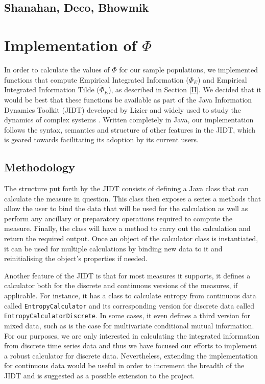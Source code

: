 \documentclass[a4paper,11pt]{article}
\begin{document}
\subsection{Shanahan, Deco, Bhowmik}

\clearpage
\section{Implementation of $\Phi$}
\label{sec:impl}

In order to calculate the values of $\Phi$ for our sample populations, we implemented functions that compute Empirical Integrated Information ($\Phi_{E}$) and Empirical Integrated Information Tilde ($\widetilde{\Phi}_{E}$), as described in Section \ref{II}. We decided that it would be best that these functions be available as part of the Java Information Dynamics Toolkit (JIDT) developed by Lizier and widely used to study the dynamics of complex systems \cite{Lizier2014}. Written completely in Java, our implementation follows the syntax, semantics and structure of other features in the JIDT, which is geared towards facilitating its adoption by its current users.

\subsection{Methodology}

The structure put forth by the JIDT consists of defining a Java class that can calculate the measure in question. This class then exposes a series a methods that allow the user to bind the data that will be used for the calculation as well as perform any ancillary or preparatory operations required to compute the measure. Finally, the class will have a method to carry out the calculation and return the required output. Once an object of the calculator class is instantiated, it can be used for multiple calculations by binding new data to it and reinitialising the object's properties if needed. 

Another feature of the JIDT is that for most measures it supports, it defines a calculator both for the discrete and continuous versions of the measures, if applicable. For instance, it has a class to calculate entropy from continuous data called \texttt{EntropyCalculator} and its corresponding version for discrete data called \texttt{EntropyCalculatorDiscrete}. In some cases, it even defines a third version for mixed data, such as is the case for multivariate conditional mutual information. For our purposes, we are only interested in calculating the integrated information from discrete time series data and thus we have focused our efforts to implement a robust calculator for discrete data. Nevertheless, extending the implementation for continuous data would be useful in order to increment the breadth of the JIDT and is suggested as a possible extension to the project.
\end{document}
